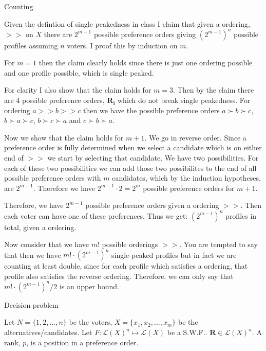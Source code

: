 \documentclass[12pt]{article}
\newenvironment{question}[2][Question]{\begin{trivlist}
\item[\hskip \labelsep {\bfseries #1}\hskip \labelsep {\bfseries #2.}]}{\end{trivlist}}
\newenvironment{answer}[2][Answer]{\begin{trivlist}
\item[\hskip \labelsep {\bfseries #1}\hskip \labelsep {\bfseries #2:}]}{\end{trivlist}}
\begin{document}
\begin{answer}{a)}{Counting}

Given the defintion of single peakedness in class I claim that given a ordering, $>>$ on $X$ there are $2^{m-1}$ possible preference orders giving $(2^{m-1})^n$ possible profiles assuming $n$ voters. I proof this by induction on $m$.

For $m=1$ then the claim clearly holds since there is just one ordering possible and one profile possible, which is single peaked.

For clarity I also show that the claim holds for $m=3$. Then by the claim there are 4 possible preference orders, $\boldsymbol{R_i}$ which do not break single peakedness. For ordering $a >> b >> c$ then we have the possible preference orders $a \succ b \succ c$, $b \succ a \succ c$, $b \succ c \succ a$ and $c \succ b \succ a$.

Now we show that the claim holds for $m+1$. We go in reverse order. Since a preference order is fully determined when we select a candidate which is on either end of $>>$ we start by selecting that candidate. We have two possibilities. For each of these two possibilities we can add those two possibilites to the end of all possible preference orders with $m$ candidates, which by the induction hypotheses, are $2^{m-1}$. Therefore we have $2^{m-1}\cdot 2=2^m$ possible preference orders for $m+1$.

Therefore, we have $2^{m-1}$ possible preference orders given a ordering $>>$. Then each voter can have one of these preferences. Thus we get: $(2^{m-1})^n$ profiles in total, given a ordering.

Now consider that we have $m!$ possible orderings $>>$. You are tempted to say that then we have $m! \cdot (2^{m-1})^n$ single-peaked profiles but in fact we are counting at least double, since for each profile which satisfies a ordering, that profile also satisfies the reverse ordering. Therefore, we can only say that $m! \cdot (2^{m-1})^n/2$ is an upper bound.
\end{answer}

\begin{question}{4}{Decision problem}

Let $N=\{1,2, ..., n\}$ be the voters, $X=\{x_1,x_2,...,x_m\}$ be the alternatives/candidates. Let $F:\mathcal{L}(X)^n \mapsto \mathcal{L}(X)$ be a S.W.F.. $\boldsymbol{R} \in \mathcal{L}(X)^n$. A rank, $p$, is a position in a preference order.
\end{question}
\end{document}
